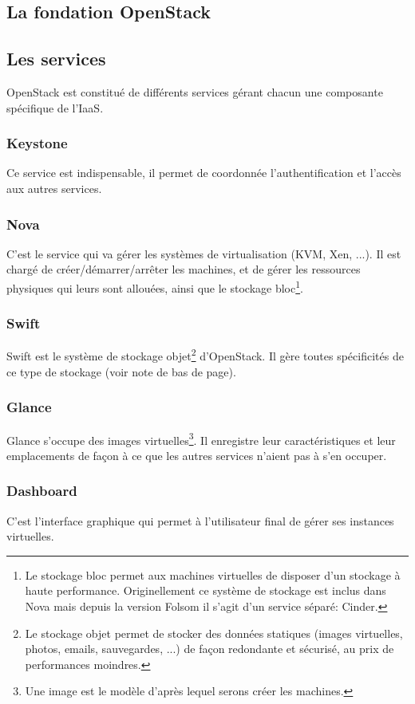 \documentclass{report}
\begin{document}
\subsection{La fondation OpenStack}


\subsection{Les services}
OpenStack est constitué de différents services gérant chacun une composante spécifique de l'IaaS.
\subsubsection{Keystone}
Ce service est indispensable, il permet de coordonnée l'authentification et l'accès aux autres services.

\subsubsection{Nova}
C'est le service qui va gérer les systèmes de virtualisation (KVM, Xen, ...). Il est chargé de créer/démarrer/arrêter les machines, et de gérer les ressources physiques qui leurs sont allouées, ainsi que le stockage bloc\footnote{Le stockage bloc permet aux machines virtuelles de disposer d'un stockage à haute performance. Originellement ce système de stockage est inclus dans Nova mais depuis la version Folsom il s'agit d'un service séparé: Cinder.}.

\subsubsection{Swift}
Swift est le système de stockage objet\footnote{Le stockage objet permet de stocker des données statiques (images virtuelles, photos, emails, sauvegardes, ...) de façon redondante et sécurisé, au prix de performances moindres.} d'OpenStack. Il gère toutes spécificités de ce type de stockage (voir note de bas de page).

\subsubsection{Glance}
Glance s'occupe des images virtuelles\footnote{Une image est le modèle d'après lequel serons créer les machines.}. Il enregistre leur caractéristiques et leur emplacements de façon à ce que les autres services n'aient pas à s'en occuper.

\subsubsection{Dashboard}
C'est l'interface graphique qui permet à l'utilisateur final de gérer ses instances virtuelles.
\end{document}
